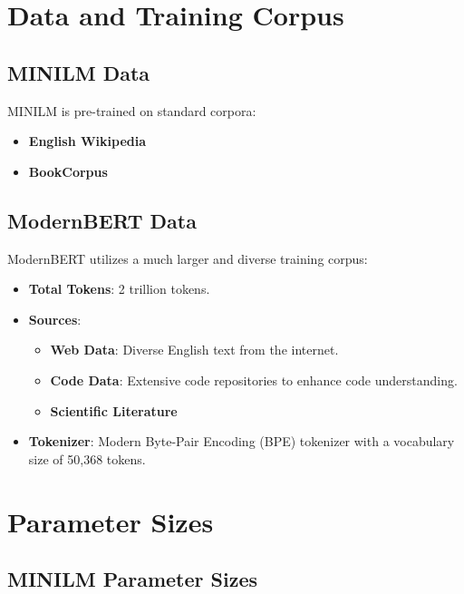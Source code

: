 \documentclass{article}
\begin{document}
\section{Data and Training Corpus}  
  
\subsection{MINILM Data}  
  
MINILM is pre-trained on standard corpora:  
  
\begin{itemize}  
    \item \textbf{English Wikipedia}  
    \item \textbf{BookCorpus} \cite{zhu2015aligning}  
\end{itemize}  
  
\subsection{ModernBERT Data}  
  
ModernBERT utilizes a much larger and diverse training corpus:  
  
\begin{itemize}  
    \item \textbf{Total Tokens}: 2 trillion tokens.  
    \item \textbf{Sources}:  
    \begin{itemize}  
        \item \textbf{Web Data}: Diverse English text from the internet.  
        \item \textbf{Code Data}: Extensive code repositories to enhance code understanding.  
        \item \textbf{Scientific Literature}  
    \end{itemize}  
    \item \textbf{Tokenizer}: Modern Byte-Pair Encoding (BPE) tokenizer with a vocabulary size of 50,368 tokens.  
\end{itemize}  
  
\section{Parameter Sizes}  
  
\subsection{MINILM Parameter Sizes}  
  
\end{document}
